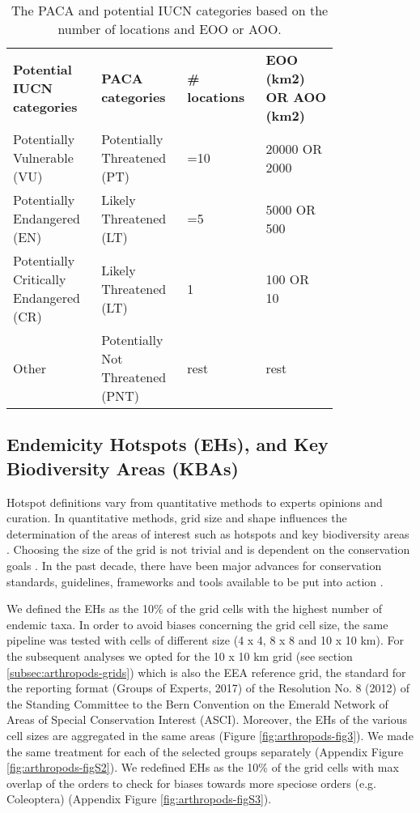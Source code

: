 \begin{table}
\centering
\caption{The PACA and potential IUCN categories based on the number of locations and EOO or AOO.}
\begin{tabular}{p{0.2\linewidth} | p{0.2\linewidth} | p{0.2\linewidth} | p{0.2\linewidth}}
\textbf{Potential IUCN categories}     & \textbf{PACA categories}         & \textbf{\# locations} & \textbf{EOO (km2) OR AOO (km2)}  \\
Potentially Vulnerable (VU)            & Potentially Threatened (PT)      & =10                   & 20000 OR 2000                    \\
Potentially Endangered (EN)            & Likely Threatened (LT)           & =5                    & 5000 OR 500                      \\
Potentially Critically Endangered (CR) & Likely Threatened (LT)           & 1                     & 100 OR 10                        \\
Other                                  & Potentially Not Threatened (PNT) & rest                  & rest                            
\end{tabular}
\label{table:arthropods-paca}
\end{table}
    
    \subsection{Endemicity Hotspots (EHs), and Key Biodiversity Areas (KBAs)}
    \label{subsec:arthropods-ehs-kbas}

Hotspot definitions vary from quantitative methods to experts opinions and curation.
In quantitative methods, grid size and shape influences the determination of
the areas of interest such as hotspots and key biodiversity areas \parencite{hurlbert2007species,nhancale2011the-influence}.
Choosing the size of the grid is not trivial \parencite{mo2019influences} and is dependent
on the conservation goals \parencite{margules2000systematic}. In the past decade,
there have been major advances for conservation standards, guidelines,
frameworks and tools available to be put into action \parencite{bongaarts2019ipbes}.

We defined the EHs as the 10\% of the grid cells with the highest number of
endemic taxa. In order to avoid biases concerning the grid cell size, the same
pipeline was tested with cells of different size (4 x 4, 8 x 8 and 10 x 10 km).
For the subsequent analyses we opted for the 10 x 10 km grid (see section \ref{subsec:arthropods-grids})
which is also the EEA reference grid, the standard for the reporting format
(Groups of Experts, 2017) of the Resolution No. 8 (2012) of the Standing Committee
to the Bern Convention on the Emerald Network of Areas of Special Conservation Interest (ASCI).
Moreover, the EHs of the various cell sizes are aggregated in the same areas (Figure \ref{fig:arthropods-fig3}).
We made the same treatment for each of the selected groups separately (Appendix Figure \ref{fig:arthropods-figS2}).
We redefined EHs as the 10\% of the grid cells with max overlap of the orders
to check for biases towards more speciose orders (e.g. Coleoptera) (Appendix Figure \ref{fig:arthropods-figS3}).

